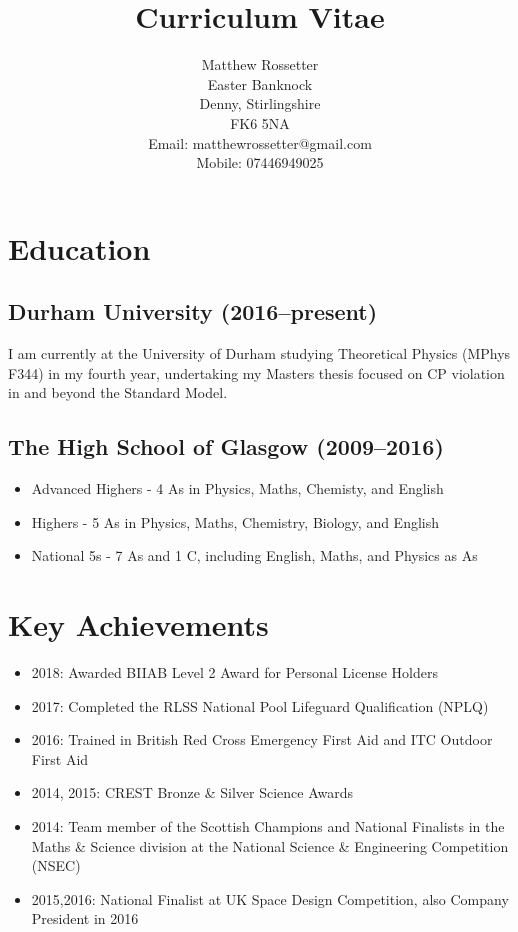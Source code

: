\documentclass[10pt, a4paper]{article}
\title{\vspace{-2.2cm}Curriculum Vitae\vspace{-0.75cm}}
\author{Matthew Rossetter \\ Easter Banknock \\ Denny, Stirlingshire \\ FK6 5NA \\ Email: matthewrossetter@gmail.com \\ Mobile: 07446949025}
\date{\vspace{-1.5cm}}
\begin{document}
\maketitle

\thispagestyle{fancy}

\section{Education}
	\subsection{Durham University (2016--present)}
    I am currently at the University of Durham studying Theoretical Physics (MPhys F344) in my fourth year, undertaking my Masters thesis focused on CP violation in and beyond the Standard Model. 
	\subsection{The High School of Glasgow (2009--2016)}
    \begin{itemize}
        \item Advanced Highers - 4 As in Physics, Maths, Chemisty, and English
        \item Highers - 5 As in Physics, Maths, Chemistry, Biology, and English
        \item National 5s - 7 As and 1 C, including English, Maths, and Physics as As
    \end{itemize}

\section{Key Achievements}
\begin{itemize}
    \item 2018: Awarded BIIAB Level 2 Award for Personal License Holders
	\item 2017: Completed the RLSS National Pool Lifeguard Qualification (NPLQ)
	\item 2016: Trained in British Red Cross Emergency First Aid and ITC Outdoor First Aid
	\item 2014, 2015: CREST Bronze \& Silver Science Awards
	\item 2014: Team member of the Scottish Champions and National Finalists in the Maths \& Science division at the National Science \& Engineering Competition (NSEC)
	\item 2015,2016: National Finalist at UK Space Design Competition, also Company President in 2016
\end{itemize}
\end{document}
